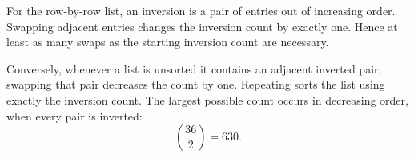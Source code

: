 For the row-by-row list, an inversion is a pair of entries out of increasing order. Swapping adjacent entries changes the inversion count by exactly one. Hence at least as many swaps as the starting inversion count are necessary.

Conversely, whenever a list is unsorted it contains an adjacent inverted pair; swapping that pair decreases the count by one. Repeating sorts the list using exactly the inversion count. The largest possible count occurs in decreasing order, when every pair is inverted:
\[
\boxed{\binom{36}{2}=630}.
\]
